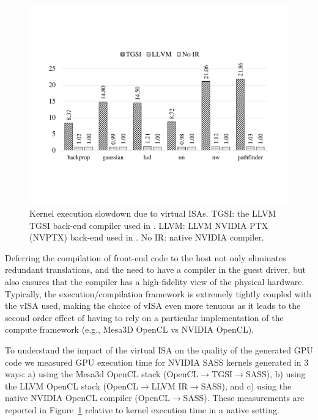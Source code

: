 \begin{figure}[!ht]
	\centering
	\includegraphics[width=.9\linewidth,trim={2cm 4.5cm 2cm 5cm},clip]{trillium/data/trillium/trillium_kernel.pdf}
	\caption{{\footnotesize Kernel execution slowdown due to virtual ISAs. TGSI: the LLVM TGSI back-end compiler used in \trxc. LLVM: LLVM NVIDIA PTX (NVPTX) back-end used in \trxd. No IR: native NVIDIA compiler.}}
	\label{fig_trillium_kernel}
\end{figure}

Deferring the compilation of front-end code to the host not only
eliminates redundant translations, and the need to have a compiler in the
guest driver,
but also ensures that the compiler has a high-fidelity view of
the physical hardware. Typically, the execution/compilation framework is
extremely tightly coupled with the vISA used, making the choice of vISA even
more tenuous as it leads to the second order effect of having to rely on a
particular implementation of the compute framework (e.g., Mesa3D OpenCL vs NVIDIA OpenCL).

To understand the impact of the virtual ISA on the quality of the generated GPU code
we measured GPU execution time for NVIDIA SASS kernels generated in 3 ways:
a) using the Mesa3d OpenCL stack (OpenCL$\rightarrow{}$TGSI$\rightarrow{}$SASS),
b) using the LLVM OpenCL stack (OpenCL$\rightarrow{}$LLVM IR$\rightarrow{}$SASS),
and c) using the native NVIDIA OpenCL compiler (OpenCL$\rightarrow{}$SASS).
These measurements are reported in Figure~\ref{fig_trillium_kernel}
relative to kernel execution time in a native setting.


